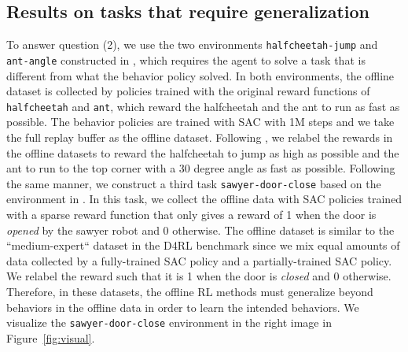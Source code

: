 \subsection{Results on tasks that require generalization}
\label{sec:generalization_exps}

To answer question (2), we use the two environments \texttt{halfcheetah-jump} and \texttt{ant-angle} constructed in \citet{yu2020mopo}, which requires the agent to solve a task that is different from what the behavior policy solved. In both environments, the offline dataset is collected by policies trained with the original reward functions of \texttt{halfcheetah} and \texttt{ant}, which reward the halfcheetah and the ant to run as fast as possible. The behavior policies are trained with SAC with 1M steps and we take the full replay buffer as the offline dataset. Following \citet{yu2020mopo}, we relabel the rewards in the offline datasets to reward the halfcheetah to jump as high as possible and the ant to run to the top corner with a 30 degree angle as fast as possible. Following the same manner, we construct a third task \texttt{sawyer-door-close} based on the environment in \citet{yu2020meta, Rafailov2020LOMPO}. In this task, we collect the offline data with SAC policies trained with a sparse reward function that only gives a reward of 1 when the door is \textit{opened} by the sawyer robot and 0 otherwise. The offline dataset is similar to the ``medium-expert`` dataset in the D4RL benchmark since we mix equal amounts of data collected by a fully-trained SAC policy and a partially-trained SAC policy. We relabel the reward such that it is 1 when the door is \textit{closed} and 0 otherwise. Therefore, in these datasets, the offline RL methods must generalize beyond behaviors in the offline data in order to learn the intended behaviors. We visualize the \texttt{sawyer-door-close} environment in the right image in Figure~\ref{fig:visual}.

